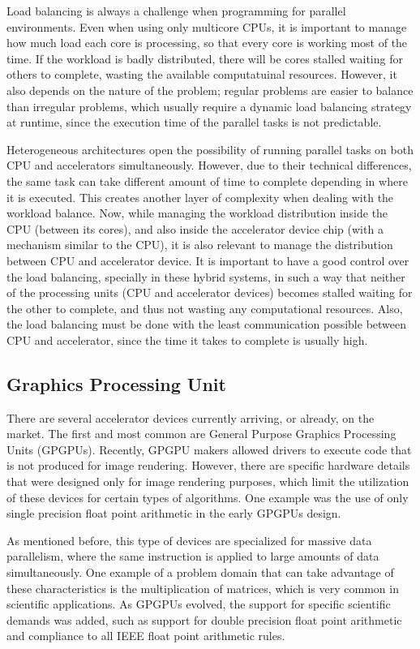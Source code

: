 Load balancing is always a challenge when programming for parallel environments. Even when using only multicore CPUs, it is important to manage how much load each core is processing, so that every core is working most of the time. If the workload is badly distributed, there will be cores stalled waiting for others to complete, wasting the available computatuinal resources. However, it also depends on the nature of the problem; regular problems are easier to balance than irregular problems, which usually require a dynamic load balancing strategy at runtime, since the execution time of the parallel tasks is not predictable.

Heterogeneous architectures open the possibility of running parallel tasks on both CPU and accelerators simultaneously. However, due to their technical differences, the same task can take different amount of time to complete depending in where it is executed. This creates another layer of complexity when dealing with the workload balance. Now, while managing the workload distribution inside the CPU (between its cores), and also inside the accelerator device chip (with a mechanism similar to the CPU), it is also relevant to manage the distribution between CPU and accelerator device. It is important to have a good control over the load balancing, specially in these hybrid systems, in such a way that neither of the processing units (CPU and accelerator devices) becomes stalled waiting for the other to complete, and thus not wasting any computational resources. Also, the load balancing must be done with the least communication possible between CPU and accelerator, since the time it takes to complete is usually high.

\subsection{Graphics Processing Unit}

There are several accelerator devices currently arriving, or already, on the market. The first and most common are General Purpose Graphics Processing Units (GPGPUs). Recently, GPGPU makers allowed drivers to execute code that is not produced for image rendering. However, there are specific hardware details that were designed only for image rendering purposes, which limit the utilization of these devices for certain types of algorithms. One example was the use of only single precision float point arithmetic in the early GPGPUs design.

As mentioned before, this type of devices are specialized for massive data parallelism, where the same instruction is applied to large amounts of data simultaneously. One example of a problem domain that can take advantage of these characteristics is the multiplication of matrices, which is very common in scientific applications. As GPGPUs evolved, the support for specific scientific demands was added, such as support for double precision float point arithmetic and compliance to all IEEE float point arithmetic rules.

